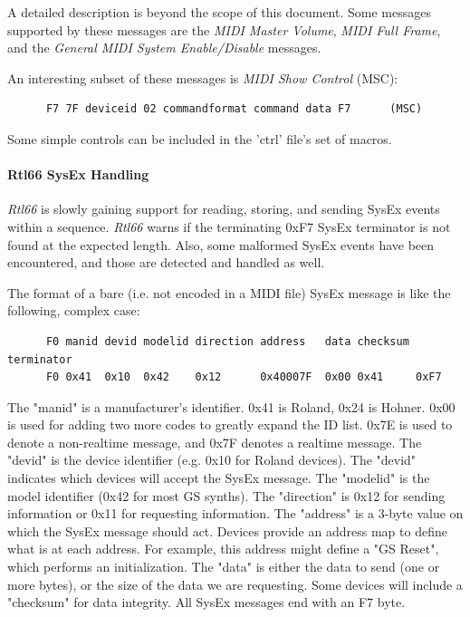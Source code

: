    A detailed description is beyond the scope of this document.
   Some messages supported by these messages are the
   \textsl{MIDI Master Volume},
   \textsl{MIDI Full Frame},
   and the \textsl{General MIDI System Enable/Disable}
   messages.

   An interesting subset of these messages is \textsl{MIDI Show Control}
   (MSC):

   \begin{verbatim}
      F7 7F deviceid 02 commandformat command data F7      (MSC)
   \end{verbatim}

   Some simple controls can be included in the 'ctrl' file's set of macros.

\paragraph{Rtl66 SysEx Handling}
\label{paragraph:midi_seq66_sysex_handling}

   \textsl{Rtl66} is slowly gaining support for reading, storing, and
   sending SysEx events within a sequence.
   \textsl{Rtl66} warns if the
   terminating 0xF7 SysEx terminator is not found at the expected length.
   Also, some malformed SysEx events have been encountered, and those are
   detected and handled as well.

   The format of a bare (i.e. not encoded in a MIDI file) SysEx message is
   like the following, complex case:

   \begin{verbatim}
      F0 manid devid modelid direction address   data checksum terminator
      F0 0x41  0x10  0x42    0x12      0x40007F  0x00 0x41     0xF7
   \end{verbatim}

   The "manid" is a manufacturer's identifier. 0x41 is Roland, 0x24 is
   Hohner. 0x00 is used for adding two more codes to greatly expand the ID
   list. 0x7E is used to denote a non-realtime message, and 0x7F denotes
   a realtime message.
   The "devid" is the device identifier (e.g. 0x10 for Roland devices).
   The "devid" indicates which devices will accept the SysEx message.
   The "modelid" is the model identifier (0x42 for most GS synths).
   The "direction" is 0x12 for sending information or 0x11 for requesting
   information.
   The "address" is a 3-byte value on which the SysEx message should act.
   Devices provide an address map to define what is at each address.
   For example, this address might define a "GS Reset", which performs
   an initialization.
   The "data" is either the data to send (one or more bytes), or the
   size of the data we are requesting.
   Some devices will include a "checksum" for data integrity.
   All SysEx messages end with an F7 byte.


